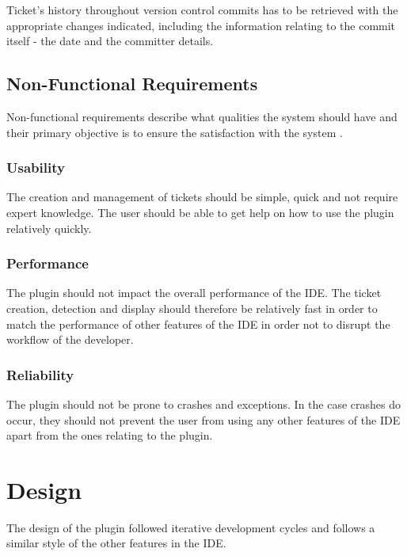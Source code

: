 \documentclass{4thYearProject}
\begin{document}
Ticket's history throughout version control commits has to be retrieved with the appropriate changes indicated, including the information relating to the commit itself - the date and the committer details.

\section{Non-Functional Requirements}

Non-functional requirements describe what qualities the system should have and their primary objective is to ensure the satisfaction with the system \cite{nonfunctional}.

\subsection{Usability}

The creation and management of tickets should be simple, quick and not require expert knowledge. The user should be able to get help on how to use the plugin relatively quickly.

\subsection{Performance}

The plugin should not impact the overall performance of the IDE. The ticket creation, detection and display should therefore be relatively fast in order to match the performance of other features of the IDE in order not to disrupt the workflow of the developer. 

\subsection{Reliability}

The plugin should not be prone to crashes and exceptions. In the case crashes do occur, they should not prevent the user from using any other features of the IDE apart from the ones relating to the plugin.  


\chapter{Design}

The design of the plugin followed iterative development cycles and follows a similar style of the other features in the IDE. 
\end{document}
